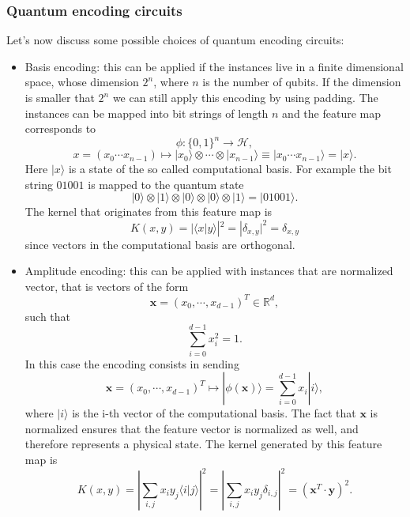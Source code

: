 \documentclass[a4paper]{article}
\begin{document}
\subsubsection{Quantum encoding circuits}
Let's now discuss some possible choices of quantum encoding circuits:
\begin{itemize}
    \item Basis encoding: this can be applied if the instances live in a finite dimensional space, whose dimension $2^n$, where $n$ is the number of qubits. If the dimension is smaller that $2^n$ we can still apply this encoding by using padding. The instances can be mapped into bit strings of length $n$ and the feature map corresponds to
    \begin{equation}
        \phi:\{0,1\}^n \rightarrow \mathcal{H},
    \end{equation}
    $$x=(x_0\cdots x_{n-1})\mapsto |x_0\rangle \otimes \cdots \otimes |x_{n-1}\rangle\equiv|x_0\cdots x_{n-1}\rangle=|x\rangle.$$ Here $|x\rangle$ is a state of the so called computational basis. For example the bit string $01001$ is mapped to the quantum state $$|0\rangle \otimes |1\rangle \otimes |0\rangle \otimes |0\rangle \otimes |1\rangle=|01001\rangle.$$ The kernel that originates from this feature map is 
    \begin{equation}
        K(x,y)=|\langle x|y\rangle|^2=|\delta_{x,y}|^2=\delta_{x,y}
    \end{equation}
    since vectors in the computational basis are orthogonal. 
    \item Amplitude encoding: this can be applied with instances that are normalized vector, that is vectors of the form 
    \begin{equation}
        \mathbf{x}=(x_0, \cdots, x_{d-1})^T\in \mathbb{R}^d,
    \end{equation}
    such that $$\sum_{i=0}^{d-1}x_i^2=1.$$
    In this case the encoding consists in sending
    \begin{equation}
        \mathbf{x}=(x_0, \cdots, x_{d-1})^T \mapsto |\phi(\mathbf{x})\rangle=\sum_{i=0}^{d-1}x_i|i\rangle,
    \end{equation}
    where $|i\rangle$ is the i-th vector of the computational basis. The fact that $\mathbf{x}$ is normalized ensures that the feature vector is normalized as well, and therefore represents a physical state. The kernel generated by this feature map is 
    \begin{equation}
        K(x,y)=\left|\sum_{i,j}x_iy_j\langle i|j\rangle\right|^2=\left|\sum_{i,j}x_iy_j\delta_{i,j}\right|^2=(\mathbf{x}^T \cdot \mathbf{y})^2.

\end{equation}
\end{itemize}
\end{document}
